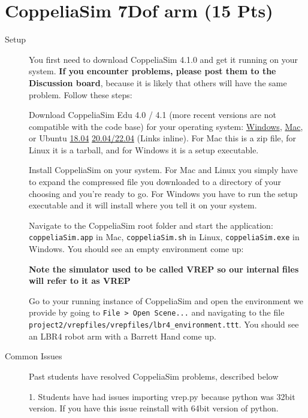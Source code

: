 \documentclass[11pt]{kuntz-hw}
\begin{document}
\section*{CoppeliaSim  7Dof arm (15 Pts)}
\begin{description}
\item[Setup]You first need to download CoppeliaSim 4.1.0 and get it running on your system. \textbf{If you encounter problems, please post them to the Discussion board}, because it is likely that others will have the same problem. Follow these steps: 

Download CoppeliaSim Edu 4.0 / 4.1 (more recent versions are not compatible with the code base) for your operating system:  \href{https://www.coppeliarobotics.com/files/CoppeliaSim_Edu_V4_0_0_Setup.exe}{Windows}, \href{https://www.coppeliarobotics.com/files/CoppeliaSim_Edu_V4_0_0_Mac.zip}{Mac}, or Ubuntu \href{https://www.coppeliarobotics.com/files/CoppeliaSim_Edu_V4_1_0_Ubuntu18_04.tar.xz}{18.04} \href{https://www.coppeliarobotics.com/files/CoppeliaSim_Edu_V4_1_0_Ubuntu20_04.tar.xz}{20.04/22.04} (Links inline). For Mac this is a zip file, for Linux it is a tarball, and for Windows it is a setup executable.
	
Install CoppeliaSim on your system. For Mac and Linux you simply have to expand the compressed file you downloaded to a directory of your choosing and you're ready to go. For Windows you have to run the setup executable and it will install where you tell it on your system.
	
Navigate to the CoppeliaSim root folder and start the application: \texttt{coppeliaSim.app} in Mac, \texttt{coppeliaSim.sh} in Linux, \texttt{coppeliaSim.exe} in Windows. You should see an empty environment come up:

\textbf{Note the simulator used to be called VREP so our internal files will refer to it as VREP}

Go to your running instance of CoppeliaSim and open the environment we provide by going to \texttt{File > Open Scene...} and navigating to the file \\ \texttt{project2/vrepfiles/vrepfiles/lbr4\_environment.ttt}. You should see an LBR4 robot arm with a Barrett Hand come up.


\item[Common Issues] Past students have resolved CoppeliaSim problems, described below

1. Students have had issues importing vrep.py because python was 32bit version. If you have this issue reinstall with 64bit version of python.


\end{description}
\end{document}
